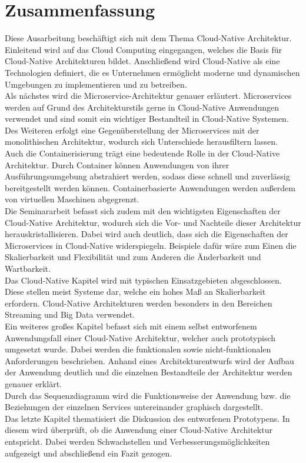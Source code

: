 \chapter*{Zusammenfassung}
Diese Ausarbeitung beschäftigt sich mit dem Thema Cloud-Native Architektur. Einleitend wird auf das Cloud Computing eingegangen, welches die Basis für Cloud-Native Architekturen bildet. Anschließend wird Cloud-Native als eine Technologien definiert, die es Unternehmen ermöglicht moderne und dynamischen Umgebungen zu implementieren und zu betreiben.\\
Als nächstes wird die Microservice-Architektur genauer erläutert. Microservices werden auf Grund des Architekturstils gerne in Cloud-Native Anwendungen verwendet und sind somit ein wichtiger Bestandteil in Cloud-Native Systemen. Des Weiteren erfolgt eine Gegenüberstellung der Microservices mit der monolithischen Architektur, wodurch sich Unterschiede herausfiltern lassen.\\
Auch die Containerisierung trägt eine bedeutende Rolle in der Cloud-Native Architektur. Durch Container können Anwendungen von ihrer Ausführungsumgebung abstrahiert werden, sodass diese schnell und zuverlässig bereitgestellt werden können. Containerbasierte Anwendungen werden außerdem von virtuellen Maschinen abgegrenzt.\\
Die Seminararbeit befasst sich zudem mit den wichtigsten Eigenschaften der Cloud-Native Architektur, wodurch sich die Vor- und Nachteile dieser Architektur herauskristallisieren. Dabei wird auch deutlich, dass sich die Eigenschaften der Microservices in Cloud-Native widerspiegeln. Beispiele dafür wäre zum Einen die Skalierbarkeit und Flexibilität und zum Anderen die Änderbarkeit und Wartbarkeit.\\
Das Cloud-Native Kapitel wird mit typischen Einsatzgebieten abgeschlossen. Diese stellen meist Systeme dar, welche ein hohes Maß an Skalierbarkeit erfordern. Cloud-Native Architekturen werden besonders in den Bereichen Streaming und Big Data verwendet.\\
Ein weiteres großes Kapitel befasst sich mit einem selbst entworfenem Anwendungsfall einer Cloud-Native Architektur, welcher auch prototypisch umgesetzt wurde. Dabei werden die funktionalen sowie nicht-funktionalen Anforderungen beschrieben. Anhand eines Architekturentwurfs wird der Aufbau der Anwendung deutlich und die einzelnen Bestandteile der Architektur werden genauer erklärt.\\
Durch das Sequenzdiagramm wird die Funktionsweise der Anwendung bzw. die Beziehungen der einzelnen Services untereinander graphisch dargestellt.\\
Das letzte Kapitel thematisiert die Diskussion des entworfenen Prototypens. In diesem wird überprüft, ob die Anwendung einer Cloud-Native Architektur entspricht. Dabei werden Schwachstellen und Verbesserungsmöglichkeiten aufgezeigt und abschließend ein Fazit gezogen.
